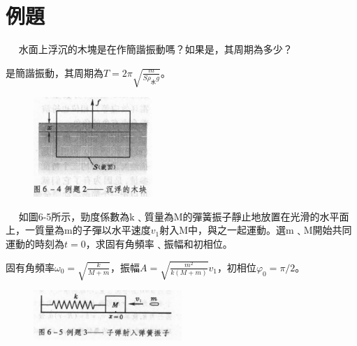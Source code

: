 \documentclass[cn,10pt,math=newtx,chinesefont=founder]{elegantbook}
\begin{document}
\section{例題}
\begin{example}　
    水面上浮沉的木塊是在作簡諧振動嗎？如果是，其周期為多少？
    
    \rightline{[2]}
    
\end{example}

\begin{solution}
是簡諧振動，其周期為$T = 2\pi \sqrt{\frac{m}{S\rho_水g}}$。
\end{solution}

\begin{figure}[htbp]
\flushright
\includegraphics[width=0.4\textwidth]{image/6-4-2.JPG}
\end{figure}

\newpage


\begin{example}　
    如圖6-5所示，勁度係數為k﹑質量為M的彈簧振子靜止地放置在光滑的水平面上，一質量為m的子彈以水平速度$v_1$射入M中，與之一起運動。選m﹑M開始共同運動的時刻為$t=0$，求固有角頻率﹑振幅和初相位。
    
    \rightline{[3]}
    
\end{example}

\begin{solution}
固有角頻率$\omega_0 = \sqrt{\frac{k}{M+m}}$，振幅$A = \sqrt{\frac{m^2}{k(M+m)}}v_1$，初相位$\varphi_0 = \pi/2$。
\end{solution}

\begin{figure}[htbp]
\flushright
\includegraphics[width=0.5\textwidth]{image/6-5-3.JPG}
\end{figure}
\end{document}
